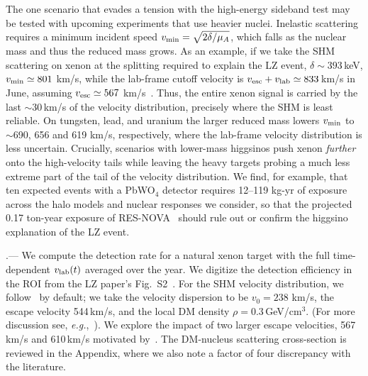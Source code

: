 \documentclass[reprint,superscriptaddress,preprintnumbers,amsmath,amssymb,aps,prd,tightenlines,longbibliography,nofootinbib]{revtex4-2}
\makeatletter
\def\section{\@ifstar\rs@star\rs@nostar}
\def\rs@nostar#1{\par\addvspace{5pt plus 2pt}\noindent{\itshape #1}.---\nobreak\ignorespaces}
\def\rs@star#1{\par\addvspace{5pt plus 2pt}\noindent{\itshape #1}.---\nobreak\ignorespaces}
\makeatother
\begin{document}
The one scenario that evades a tension with the high-energy sideband test may be tested with upcoming experiments that use heavier nuclei.
Inelastic scattering requires a minimum incident speed $v_{\rm min} = \sqrt{2\delta/\mu_A}$, which falls as the nuclear mass and thus the reduced mass grows.
As an example, if we take the SHM scattering on xenon at the splitting required to explain the LZ event, $\delta \sim 393$\,keV, $v_{\rm min} \simeq 801$ km/s, while the lab-frame cutoff velocity is $v_{\rm esc} + v_{\rm lab} \simeq 833$\,km/s in June, assuming $v_{\rm esc} \simeq 567$ km/s~\cite{Folsom:2025lly}.
Thus, the entire xenon signal is carried by the last $\sim$30\,km/s of the velocity distribution, precisely where the SHM is least reliable.
On tungsten, lead, and uranium the larger reduced mass lowers $v_{\rm min}$ to $\sim$690, 656 and 619 km/s, respectively, where the lab-frame velocity distribution is less uncertain.  
Crucially, scenarios with lower-mass higgsinos push xenon {\it further} onto the high-velocity tails while leaving the heavy targets probing a much less extreme part of the tail of the velocity distribution. We find, for example, that ten expected events with a PbWO$_4$ detector requires 12--119 kg-yr of exposure across the halo models and nuclear responses we consider, so that the projected 0.17 ton-year {exposure} of RES-NOVA~\cite{RES-NOVA:2026} should rule {out} or confirm the higgsino explanation of the LZ event.

\section{Fitting the higgsino model to the LZ ROI data}
%
We compute the detection rate for a natural xenon target with the full time-dependent $v_{\rm lab}(t)$ averaged over the year. We digitize the detection efficiency in the ROI from the LZ paper's Fig.~S2~\cite{LZ:2026axp}.
For the SHM velocity distribution, we follow~\cite{Baxter:2021pqo} by default; we take the velocity dispersion to be $v_0 = 238$ km/s, the escape velocity 544\,km/s, and the local DM density $\rho = 0.3$\,GeV/cm$^3$.
(For more discussion see, {\it e.g.},~\cite{Safdi:2022xkm}).
We explore the impact of two larger escape velocities, 567\,km/s and 610\,km/s motivated by~\cite{Folsom:2025lly}.
The DM-nucleus scattering cross-section is reviewed in the Appendix, where we also note a factor of four discrepancy with the literature.
\end{document}
